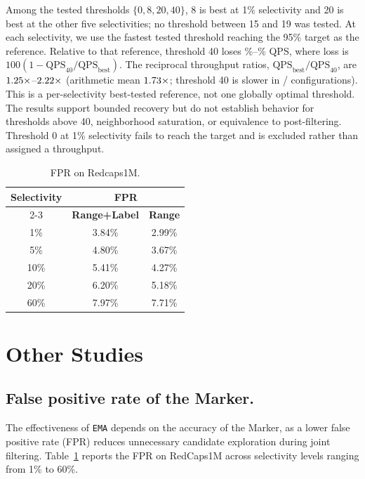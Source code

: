 Among the tested thresholds $\{0,8,20,40\}$, 8 is best at 1\% selectivity and 20 is best at the other five selectivities; no threshold between 15 and 19 was tested.
At each selectivity, we use the fastest tested threshold reaching the 95\% target as the reference.
Relative to that reference, threshold 40 loses \EMARecoveryPercentMin\%--\EMARecoveryPercentMax\% QPS, where loss is $100(1-\mathrm{QPS}_{40}/\mathrm{QPS}_{\mathrm{best}})$.
The reciprocal throughput ratios, $\mathrm{QPS}_{\mathrm{best}}/\mathrm{QPS}_{40}$, are $1.25\times$--$2.22\times$ (arithmetic mean $1.73\times$; threshold 40 is slower in \EMARecoveryWins/\EMARecoveryTotal{} configurations).
This is a per-selectivity best-tested reference, not one globally optimal threshold.
The results support bounded recovery but do not establish behavior for thresholds above 40, neighborhood saturation, or equivalence to post-filtering.
Threshold 0 at 1\% selectivity fails to reach the target and is excluded rather than assigned a throughput.


\begin{table}[t]
    \caption{FPR on Redcaps1M.}
    \label{tab:fpr}
    \centering
    \begin{tabular}{c|c|c}
        \hline
        \multirow{2}{*}{\textbf{Selectivity}}
          & \multicolumn{2}{c}{\textbf{FPR}} \\
        \cline{2-3}
        & \textbf{Range+Label} &\textbf{Range} \\
        \hline
        \hline
          1\% & 3.84\% & 2.99\% \\
        \hline
          5\% & 4.80\% & 3.67\%  \\
        \hline
          10\% & 5.41\%  & 4.27\% \\
        \hline
          20\% & 6.20\% & 5.18\%  \\
        \hline
          60\% & 7.97\% & 7.71\%  \\
        \hline
    \end{tabular}
\end{table}


\section{Other Studies}
\subsection{False positive rate of the Marker.}
The effectiveness of \texttt{EMA} depends on the accuracy of the Marker, as a lower false positive rate (FPR) reduces unnecessary candidate exploration during joint filtering.
Table~\ref{tab:fpr} reports the FPR on RedCaps1M across selectivity levels ranging from 1\% to 60\%.

